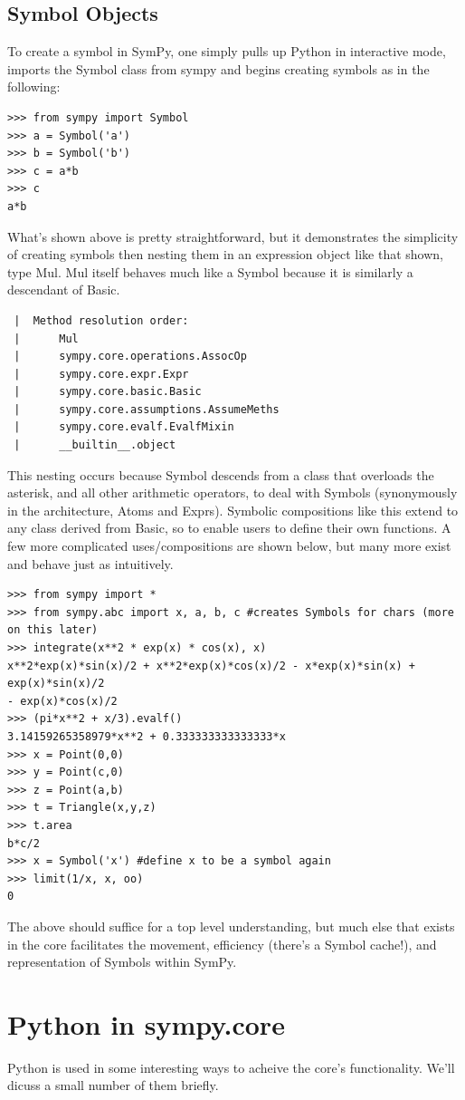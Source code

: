\documentclass[11pt,a4paper,oneside]{report}
\begin{document}
\subsection*{Symbol Objects}
To create a symbol in SymPy, one simply pulls up Python in interactive mode, imports the Symbol class from sympy and begins creating symbols as in the following:
\begin{verbatim}
>>> from sympy import Symbol
>>> a = Symbol('a')
>>> b = Symbol('b')
>>> c = a*b
>>> c
a*b
\end{verbatim}
What's shown above is pretty straightforward, but it demonstrates the simplicity of creating symbols then nesting them in an expression object like that shown, type Mul. Mul itself behaves much like a Symbol because it is similarly a descendant of Basic.
\begin{verbatim}
 |  Method resolution order:
 |      Mul
 |      sympy.core.operations.AssocOp
 |      sympy.core.expr.Expr
 |      sympy.core.basic.Basic
 |      sympy.core.assumptions.AssumeMeths
 |      sympy.core.evalf.EvalfMixin
 |      __builtin__.object
\end{verbatim}
This nesting occurs because Symbol descends from a class that overloads the asterisk, and all other arithmetic operators, to deal with Symbols (synonymously in the architecture, Atoms and Exprs). Symbolic compositions like this extend to any class derived from Basic, so to enable users to define their own functions. A few more complicated uses/compositions are shown below, but many more exist and behave just as intuitively.
\begin{verbatim}
>>> from sympy import *
>>> from sympy.abc import x, a, b, c #creates Symbols for chars (more on this later)
>>> integrate(x**2 * exp(x) * cos(x), x)
x**2*exp(x)*sin(x)/2 + x**2*exp(x)*cos(x)/2 - x*exp(x)*sin(x) + exp(x)*sin(x)/2 
- exp(x)*cos(x)/2
>>> (pi*x**2 + x/3).evalf()
3.14159265358979*x**2 + 0.333333333333333*x
>>> x = Point(0,0)
>>> y = Point(c,0)
>>> z = Point(a,b)
>>> t = Triangle(x,y,z)
>>> t.area
b*c/2
>>> x = Symbol('x') #define x to be a symbol again
>>> limit(1/x, x, oo)
0
\end{verbatim}
The above should suffice for a top level understanding, but much else that exists in the core facilitates the movement, efficiency (there's a Symbol cache!), and representation of Symbols within SymPy.
\section*{Python in sympy.core}
Python is used in some interesting ways to acheive the core's functionality. We'll dicuss a small number of them briefly.
\end{document}
